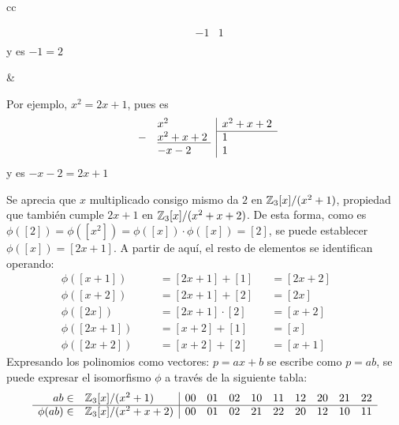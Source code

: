 \begin{Revision}
\begin{ejs}
\begin{center}
\begin{tabular}{cc}
\begin{minipage}[t]{0.4\textwidth}
\[\begin{array}{rl|l}
                        &-1& 1 \\
                    \end{array}
                    \]
                    y es $-1 = 2$
                \end{minipage}
                &
                \begin{minipage}[t]{0.4\textwidth}
                    \vspace{0.1em}
                    \centering
                    Por ejemplo, $x^2 =  2x + 1$, pues es\vspace{-0.2em}            
                    \[
                    \begin{array}{rl|l}
                        &x^2 & x^2 +x + 2\\\cline{3-3} 
                        - & \underline{x^2 + x+ 2\phantom{l}} & 1\\
                        &-x-2& 1 \\
                    \end{array}
                    \]
                    y es $-x-2 = 2x + 1$
                \end{minipage}
            \end{tabular}
        \end{center}
        
        Se aprecia que $x$ multiplicado consigo mismo da $2$ en $\mathbb{Z}_3[x]/(x^2 + 1)$, propiedad que también cumple $2x + 1$ en $\mathbb{Z}_3[x]/(x^2 +x + 2)$. De esta forma, como es $\phi([2]) =\phi([x^2]) =\phi([x]) \cdot \phi([x]) = [2]$, se puede establecer $\phi([x]) = [2x+1]$. A partir de aquí, el resto de elementos se identifican operando:
        \vspace{-0.5em}
        \begin{align*}
            &&&&\phi([x + 1]) &&&= [2x+1] + [1] &&= [2x+2]&& &&&&   \\
            &&&&\phi([x + 2]) &&&= [2x+1] + [2] &&= [2x]&&  &&&&    \\
            &&&&\phi([2x]) &&&= [2x+1] \cdot [2] &&= [x+2]&& &&&&   \\
            &&&&\phi([2x + 1]) &&&= [x+2] + [1] &&= [x]&&    &&&&   \\
           && &&\phi([2x + 2]) &&&= [x+2] + [2] &&= [x+1]&& &&&&
        \end{align*}
        Expresando los polinomios como vectores: $p = ax + b$ se escribe como $p = ab$, se puede expresar el isomorfismo $\phi$ a través de la siguiente tabla:        
        \[
            \begin{array}{rl|ccccccccc}
            ab \in &      \mathbb{Z}_3[x]/(x^2 + 1)    & 00&01&02&10&11&12&20&21&22 \\
            \hline
            \phi(ab) \in &  \mathbb{Z}_3[x]/(x^2 +x + 2) & 00&01&02&21&22&20&12&10&11
            \end{array}
        \]    


\end{ejs}
\end{Revision}
